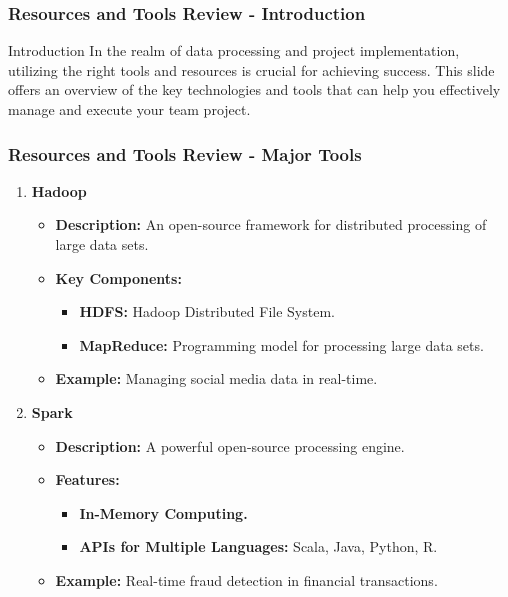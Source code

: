 \documentclass{beamer}
\begin{document}
\begin{frame}[fragile]
    \frametitle{Resources and Tools Review - Introduction}
    \begin{block}{Introduction}
        In the realm of data processing and project implementation, utilizing the right tools and resources is crucial for achieving success. This slide offers an overview of the key technologies and tools that can help you effectively manage and execute your team project.
    \end{block}
\end{frame}

\begin{frame}[fragile]
    \frametitle{Resources and Tools Review - Major Tools}
    \begin{enumerate}
        \item \textbf{Hadoop}
        \begin{itemize}
            \item \textbf{Description:} An open-source framework for distributed processing of large data sets.
            \item \textbf{Key Components:}
            \begin{itemize}
                \item \textbf{HDFS:} Hadoop Distributed File System.
                \item \textbf{MapReduce:} Programming model for processing large data sets.
            \end{itemize}
            \item \textbf{Example:} Managing social media data in real-time.
        \end{itemize}
        
        \item \textbf{Spark}
        \begin{itemize}
            \item \textbf{Description:} A powerful open-source processing engine.
            \item \textbf{Features:}
            \begin{itemize}
                \item \textbf{In-Memory Computing.}
                \item \textbf{APIs for Multiple Languages:} Scala, Java, Python, R.
            \end{itemize}
            \item \textbf{Example:} Real-time fraud detection in financial transactions.
        \end{itemize}
    \end{enumerate}
\end{frame}
\end{document}
